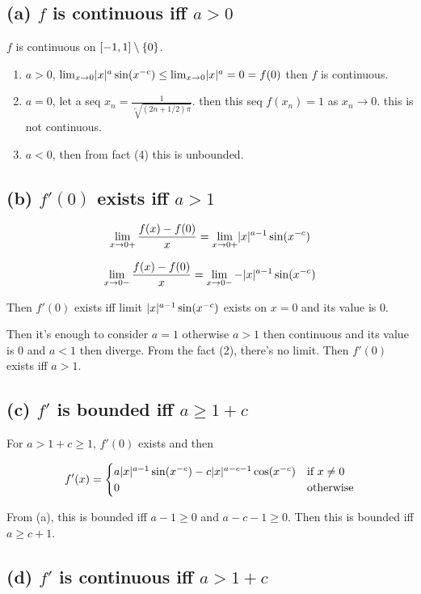 \documentclass{article}
\begin{document}
\subsection*{(a) $f$ is continuous iff $a > 0$}

$f$ is continuous on $[-1,1] \setminus \left\{ 0 \right\}$.

\begin{enumerate}
    \item $a>0$, $\lim_{x \to 0} \lvert x\rvert^a \sin(x^{-c}) \leq \lim_{x \to 0} \lvert x\rvert^a = 0 = f(0)$ then $f$ is continuous.
    \item $a=0$, let a seq $x_n = \frac{1}{\sqrt[c]{(2n+1/2)\pi}}$. then this seq $f(x_n) = 1$ as $x_n \to 0$. this is not continuous.
    \item $a<0$, then from fact (4) this is unbounded.
\end{enumerate}

\subsection*{(b) $f'(0)$ exists iff $a > 1$}

\[
\lim_{x \to 0+} \frac{f(x)-f(0)}{x} = \lim_{x \to 0+} \lvert x\rvert^{a-1} \sin(x^{-c})
\]

\[
\lim_{x \to 0-} \frac{f(x)-f(0)}{x} = \lim_{x \to 0-} -\lvert x\rvert^{a-1} \sin(x^{-c})
\]

Then $f'(0)$ exists iff limit $\lvert x\rvert^{a-1} \sin(x^{-c})$ exists on $x=0$ and its value is $0$.

Then it's enough to consider $a=1$ otherwise $a>1$ then continuous and its value is $0$ and $a<1$ then diverge. From the fact (2), there's no limit. Then $f'(0)$ exists iff $a>1$.

\subsection*{(c) $f'$ is bounded iff $a \geq 1 + c$}

For $a > 1 + c \geq 1$, $f'(0)$ exists and then

\[f'(x)=
\begin{cases}
a\lvert x\rvert^{a-1} \sin(x^{-c}) - c \lvert x\rvert^{a-c-1} \cos(x^{-c}) & \text{if } x \neq 0 \\
0 & \text{otherwise}
\end{cases}
\]

From (a), this is bounded iff $a-1 \geq 0$ and $a-c-1 \geq 0$. Then this is bounded iff $a \geq c+1$.

\subsection*{(d) $f'$ is continuous iff $a > 1+c$}
\end{document}
